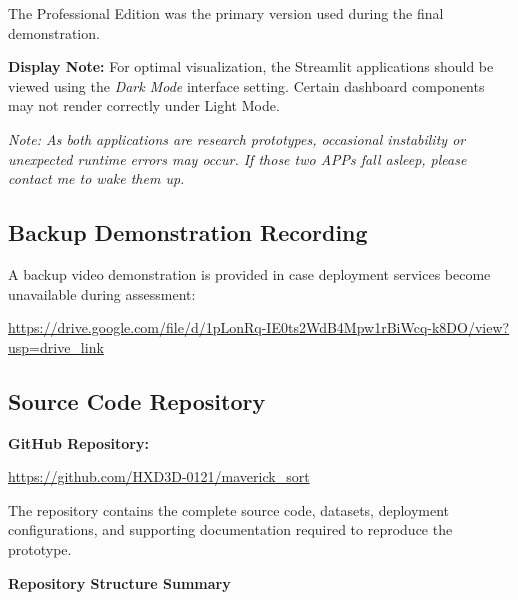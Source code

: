 The Professional Edition was the primary version used during the final demonstration.

\textbf{Display Note:}
For optimal visualization, the Streamlit applications should be viewed using the \textit{Dark Mode} interface setting. Certain dashboard components may not render correctly under Light Mode.

\textit{Note: As both applications are research prototypes, occasional instability or unexpected runtime errors may occur. If those two APPs fall asleep, please contact me to wake them up.}

\subsection{Backup Demonstration Recording}

A backup video demonstration is provided in case deployment services become unavailable during assessment:

\url{https://drive.google.com/file/d/1pLonRq-IE0ts2WdB4Mpw1rBiWcq-k8DO/view?usp=drive_link}

\subsection{Source Code Repository}

\textbf{GitHub Repository:}

\url{https://github.com/HXD3D-0121/maverick_sort}

The repository contains the complete source code, datasets, deployment configurations, and supporting documentation required to reproduce the prototype.

\textbf{Repository Structure Summary}

